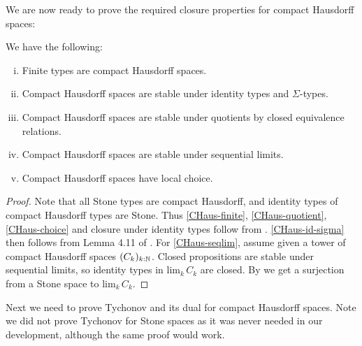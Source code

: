 We are now ready to prove the required closure properties for compact Hausdorff spaces:

\begin{proposition}
We have the following:

\begin{enumerate}[(i)]
  \item\label{CHaus-finite} Finite types are compact Hausdorff spaces.
  \item\label{CHaus-id-sigma} Compact Hausdorff spaces are stable under identity types and $\Sigma$-types.
  \item\label{CHaus-quotient} Compact Hausdorff spaces are stable under quotients by closed equivalence relations.
  \item\label{CHaus-seqlim} Compact Hausdorff spaces are stable under sequential limits.
  \item\label{CHaus-choice} Compact Hausdorff spaces have local choice.
\end{enumerate}
\end{proposition}

\begin{proof}
  Note that all Stone types are compact Hausdorff, and identity types of compact Hausdorff types are Stone. Thus \ref{CHaus-finite}, \ref{CHaus-quotient}, \ref{CHaus-choice} and closure under identity types follow from . \ref{CHaus-id-sigma} then follows from Lemma 4.11 of \cite{synthetic-stone-duality}. For \ref{CHaus-seqlim}, 
assume given a tower of compact Hausdorff spaces $(C_k)_{k:\mathbb{N}}$. Closed propositions are stable under sequential limits, so identity types in $\mathrm{lim}_k\,C_k$ are closed. By  we get a surjection from a Stone space to $\mathrm{lim}_k\,C_k$.
\end{proof}


Next we need to prove Tychonov and its dual for compact Hausdorff spaces. Note we did not prove Tychonov for Stone spaces as it was never needed in our development, although the same proof would work.

